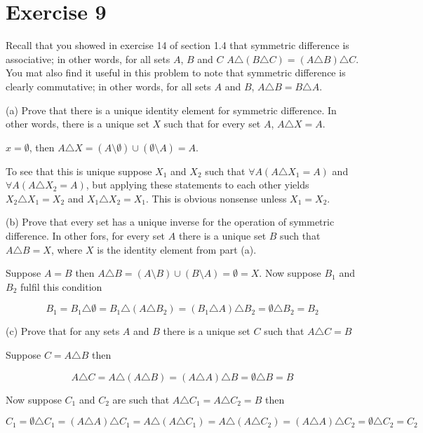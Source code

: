 \documentclass[11pt]{article}
\begin{document}
\section*{Exercise 9}

Recall that you showed in exercise 14 of section 1.4 that symmetric difference is 
associative; in other words, for all sets $A$, $B$ and $C$ 
$A \triangle (B \triangle C) = (A \triangle B) \triangle C$. You mat also find it 
useful in this problem to note that symmetric difference is clearly 
commutative; in other words, for all sets $A$ and $B$, 
$A \triangle B = B \triangle A$.

\noindent (a) Prove that there is a unique identity element for symmetric 
difference. In other words, there is a unique set $X$ such that for every 
set $A$, $A \triangle X = A$.

$x = \emptyset$, then 
$A \triangle X = (A \setminus \emptyset) \cup (\emptyset \setminus A) = A$.

To see that this is unique suppose $X_1$ and $X_2$ such that 
$\forall A (A \triangle X_1 = A)$ and $\forall A (A \triangle X_2 = A)$, but 
applying these statements to each other yields 
$X_2 \triangle X_1 = X_2$ and $X_1 \triangle X_2 = X_1$. This is obvious
nonsense unless $X_1 = X_2$.

\noindent (b) Prove that every set has a unique inverse for the operation of 
symmetric difference. In other fors, for every set $A$ there is a unique 
set $B$ such that $A \triangle B = X$, where $X$ is the identity element from 
part (a).

Suppose $A = B$ then 
$A \triangle B = (A \setminus B) \cup (B \setminus A) = \emptyset = X$. Now 
suppose $B_1$ and $B_2$ fulfil this condition 

$$B_1 = 
B_1 \triangle \emptyset = 
B_1 \triangle (A \triangle B_2) =
(B_1 \triangle A) \triangle B_2 =
\emptyset \triangle B_2 =
B_2$$

\noindent (c) Prove that for any sets $A$ and $B$ there is a unique set $C$ 
such that $A \triangle C = B$

Suppose $C = A \triangle B$ then 

$$A \triangle C =
A \triangle (A \triangle B) = 
(A \triangle A) \triangle B =
\emptyset \triangle B =
B$$

Now suppose $C_1$ and $C_2$ are such that $A \triangle C_1 = A \triangle C_2 = B$ then 

$$C_1 =
\emptyset \triangle C_1 =
(A \triangle A) \triangle C_1 = 
A \triangle (A \triangle C_1) =
A \triangle (A \triangle C_2) = 
(A \triangle A) \triangle C_2 =
\emptyset \triangle C_2 =
C_2$$
\end{document}
